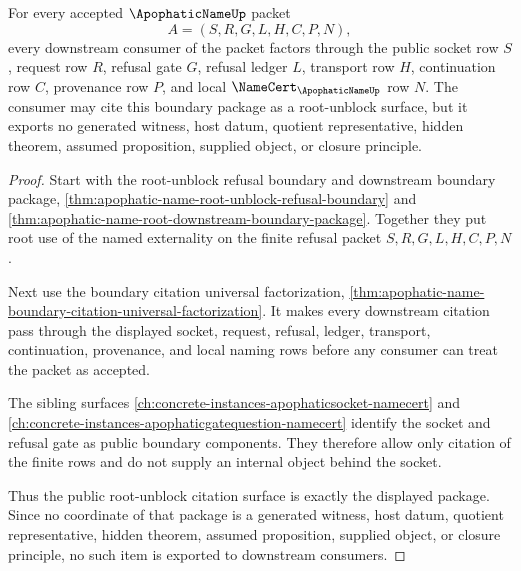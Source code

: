 \begin{theorem}
\label{thm:apophatic-name-root-unblock-public-citation-surface}
For every accepted $\ApophaticNameUp$ packet
$$
A=(S,R,G,L,H,C,P,N),
$$
every downstream consumer of the packet factors through the public socket row $S$, request row $R$, refusal gate $G$, refusal ledger $L$, transport row $H$, continuation row $C$, provenance row $P$, and local $\NameCert_{\ApophaticNameUp}$ row $N$. The consumer may cite this boundary package as a root-unblock surface, but it exports no generated witness, host datum, quotient representative, hidden theorem, assumed proposition, supplied object, or closure principle.
\end{theorem}
\begin{proof}
Start with the root-unblock refusal boundary and downstream boundary package, \autoref{thm:apophatic-name-root-unblock-refusal-boundary} and \autoref{thm:apophatic-name-root-downstream-boundary-package}. Together they put root use of the named externality on the finite refusal packet $S,R,G,L,H,C,P,N$.

Next use the boundary citation universal factorization, \autoref{thm:apophatic-name-boundary-citation-universal-factorization}. It makes every downstream citation pass through the displayed socket, request, refusal, ledger, transport, continuation, provenance, and local naming rows before any consumer can treat the packet as accepted.

The sibling surfaces \autoref{ch:concrete-instances-apophaticsocket-namecert} and \autoref{ch:concrete-instances-apophaticgatequestion-namecert} identify the socket and refusal gate as public boundary components. They therefore allow only citation of the finite rows and do not supply an internal object behind the socket.

Thus the public root-unblock citation surface is exactly the displayed package. Since no coordinate of that package is a generated witness, host datum, quotient representative, hidden theorem, assumed proposition, supplied object, or closure principle, no such item is exported to downstream consumers.
\end{proof}

